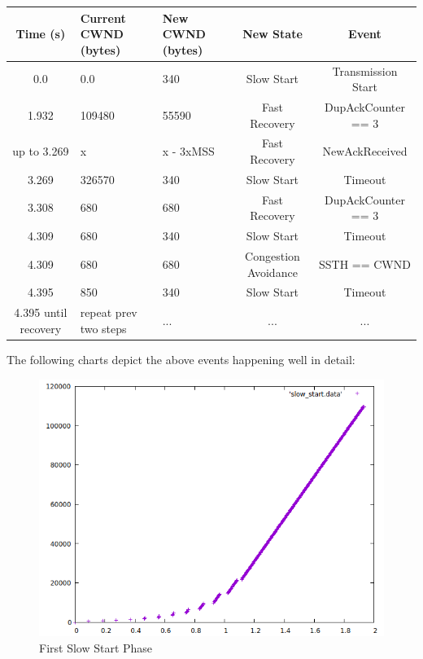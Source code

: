 \documentclass{article}
\begin{document}
\begin{table}
\begin{tabular}{|c|p{25mm}|p{20mm}|c|c|}
\hline Time (s)    & Current CWND (bytes)    & New CWND (bytes)    & New State    & Event \\
\hline 0.0       &         0.0     &     340     &       Slow Start      &  Transmission Start\\ 
\hline 1.932     &      109480     &    55590    &       Fast Recovery   &  DupAckCounter == 3\\
\hline up to 3.269 &    x          &  x - 3xMSS  &       Fast Recovery   &  NewAckReceived\\
\hline 3.269     &      326570     &     340     &       Slow Start      &  Timeout\\ 
\hline 3.308     &      680        &     680     &       Fast Recovery   &  DupAckCounter == 3\\   
\hline 4.309     &      680        &     340     &       Slow Start      &  Timeout\\ 
\hline 4.309     &      680        &     680     &       Congestion Avoidance   &  SSTH == CWND\\ 
\hline 4.395     &      850        &     340     &       Slow Start      &  Timeout\\
\hline 4.395 until recovery     &      repeat prev two steps       &  ...  & ...  &  ... \\
\hline
\end{tabular} 
\end{table}

The following charts depict the above events happening well in detail:

\begin{figure}[h]
    \centering
    \includegraphics[scale=0.4]{images/lab1-group11-task1-question3-1.png}
    \caption{First Slow Start Phase}
    \label{fig:slow_start}
\end{figure}
\end{document}

